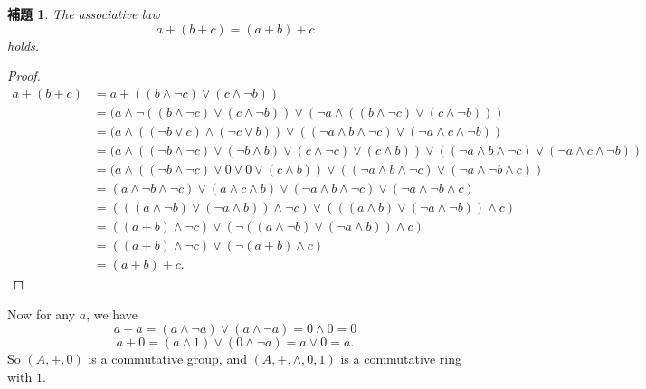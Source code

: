 \documentclass[a4j,12pt]{jarticle}
\numberwithin{equation}{section}
\newtheorem{lemma}[thm]{補題}
\begin{document}
\begin{lemma}
  The associative law
  \begin{equation}
    a+(b+c) = (a+b)+c
  \end{equation}
  holds.
\end{lemma}
\begin{proof}
  \begin{align*}
    a+(b+c) &= a+((b \wedge \neg c) \vee (c \wedge \neg b)) \\
            &= (a \wedge \neg ((b \wedge \neg c) \vee (c \wedge \neg b)) \vee (\neg a \wedge ((b \wedge \neg c) \vee (c \wedge \neg b))) \\
            &= (a \wedge ((\neg b \vee c) \wedge (\neg c \vee b)) \vee ((\neg a \wedge b \wedge \neg c) \vee (\neg a \wedge c \wedge \neg b)) \\
            &= (a \wedge ((\neg b \wedge \neg c) \vee (\neg b \wedge b) \vee (c \wedge \neg c) \vee (c \wedge b)) \vee ((\neg a \wedge b \wedge \neg c) \vee (\neg a \wedge c \wedge \neg b)) \\
            &= (a \wedge ((\neg b \wedge \neg c) \vee 0 \vee 0 \vee (c \wedge b)) \vee ((\neg a \wedge b \wedge \neg c) \vee (\neg a \wedge \neg b \wedge c)) \\
            &= (a \wedge \neg b \wedge \neg c) \vee (a \wedge c \wedge b) \vee (\neg a \wedge b \wedge \neg c) \vee (\neg a \wedge \neg b \wedge c) \\
            &= (((a \wedge \neg b) \vee (\neg a \wedge b )) \wedge \neg c) \vee (((a \wedge b) \vee  (\neg a \wedge \neg b)) \wedge c) \\
            &= ((a+b) \wedge \neg c) \vee (\neg ((a \wedge \neg b) \vee  (\neg a \wedge b)) \wedge c) \\
            &= ((a+b) \wedge \neg c) \vee (\neg (a+b) \wedge c) \\
            &= (a+b) + c.
  \end{align*}
\end{proof}
Now for any $a$, we have
\begin{equation}
  a+a=(a \wedge \neg a) \vee (a \wedge \neg a) = 0 \wedge 0=0
\end{equation}
\begin{equation}
  a + 0 = (a \wedge 1) \vee (0 \wedge \neg a) = a \vee 0 = a.
\end{equation}
So $(A, +, 0)$ is a commutative group, and $(A, +, \wedge, 0, 1)$ is a commutative ring with $1$.
\end{document}
